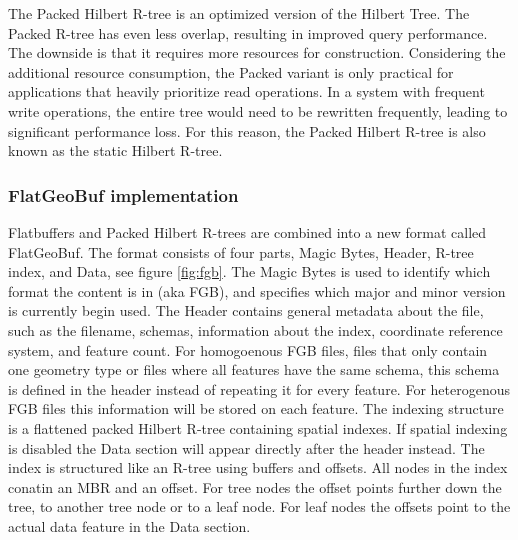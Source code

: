 The Packed Hilbert R-tree is an optimized version of the Hilbert Tree. The Packed R-tree has even less overlap, resulting in improved query performance. The downside is that it requires more resources for construction. Considering the additional resource consumption, the Packed variant is only practical for applications that heavily prioritize read operations. In a system with frequent write operations, the entire tree would need to be rewritten frequently, leading to significant performance loss. For this reason, the Packed Hilbert R-tree is also known as the static Hilbert R-tree.

\subsubsection{FlatGeoBuf implementation}
Flatbuffers and Packed Hilbert R-trees are combined into a new format called FlatGeoBuf. The format consists of four parts, Magic Bytes, Header, R-tree index, and Data, see figure \ref{fig:fgb}. The Magic Bytes is used to identify which format the content is in (aka FGB), and specifies which major and minor version is currently begin used. The Header contains general metadata about the file, such as the filename, schemas, information about the index, coordinate reference system, and feature count. For homogoenous FGB files, files that only contain one geometry type or files where all features have the same schema, this schema is defined in the header instead of repeating it for every feature. For heterogenous FGB files this information will be stored on each feature. The indexing structure is a flattened packed Hilbert R-tree containing spatial indexes. If spatial indexing is disabled the Data section will appear directly after the header instead. The index is structured like an R-tree using buffers and offsets. All nodes in the index conatin an MBR and an offset. For tree nodes the offset points further down the tree, to another tree node or to a leaf node. For leaf nodes the offsets point to the actual data feature in the Data section.

